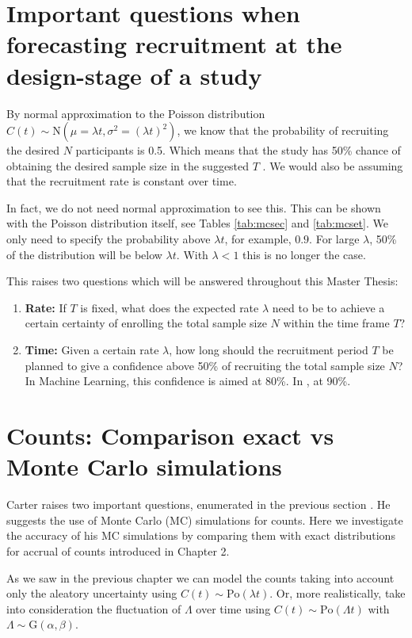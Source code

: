 \section{Important questions when forecasting recruitment at the design-stage of a study}

By normal approximation to the Poisson distribution $C(t)\sim \textrm{N}(\mu=\lambda t, \sigma^2=(\lambda t)^2)$, we know that the probability of recruiting the desired $N$ participants is 0.5. Which means that the study has 50\% chance of obtaining the desired sample size in the suggested $T$ \citep{carter2004application}. We would also be assuming that the recruitment rate is constant over time.

In fact, we do not need normal approximation to see this. This can be shown with the Poisson distribution itself, see Tables \ref{tab:mcsec} and \ref{tab:mcset}. We only need to specify the probability above $\lambda t$, for example, $0.9$. For large $\lambda$, 50\% of the distribution will be below $\lambda t$. With $\lambda < 1$ this is no longer the case. 

This raises two questions which will be answered throughout this Master Thesis:
\begin{enumerate}
\item \textbf{Rate:} If $T$ is fixed, what does the expected rate $\lambda$ need to be to achieve a certain certainty of enrolling the total sample size $N$ within the time frame $T$?
\item \textbf{Time:} Given a certain rate $\lambda$, how long should the recruitment period $T$ be planned to give a confidence above 50\% of recruiting the total sample size $N$? In Machine Learning, this confidence is aimed at 80\%. In \cite{carter2004application}, at 90\%.
\end{enumerate}


\section{Counts: Comparison exact vs Monte Carlo simulations}

Carter raises two important questions, enumerated in the previous section \citep{carter2004application, carter2005practical}. He suggests the use of Monte Carlo (MC) simulations for counts. Here we investigate the accuracy of his MC simulations by comparing them with exact distributions for accrual of counts introduced in Chapter 2.

As we saw in the previous chapter we can model the counts taking into account only the aleatory uncertainty using $C(t)\sim \textrm{Po}(\lambda t)$. Or, more realistically, take into consideration the fluctuation of $\Lambda$ over time using $C(t)\sim \textrm{Po}(\Lambda t)$ with $\Lambda\sim \textrm{G}(\alpha, \beta)$.

